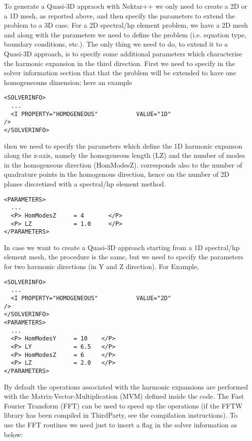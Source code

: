 To generate a Quasi-3D appraoch with Nektar++ we only need to create a 2D or a
1D mesh, as reported above, and then specify the parameters to extend the
problem to a 3D case. For a 2D spectral/hp element problem, we have a 2D mesh
and along with the parameters we need to define the problem (i.e. equation type,
boundary conditions, etc.). The only thing we need to do, to extend it to a
Quasi-3D approach, is to specify some additional parameters which characterise
the harmonic expansion in the third direction. First we need to specify in the
solver information section that that the problem will be extended to have one
homogeneouns dimension; here an example

\begin{lstlisting}[style=XMLStyle]
<SOLVERINFO>
  ...
  <I PROPERTY="HOMOGENEOUS"           VALUE="1D"                       />
</SOLVERINFO>
\end{lstlisting}

then we need to specify the parameters which define the 1D harmonic expanson
along the z-axis, namely the homogeneous length (LZ) and the number of modes in
the homogeneous direction (HomModesZ).  corresponds also to the number
of quadrature points in the homogenous direction, hence on the number of 2D
planes discretized with a spectral/hp element method.

\begin{lstlisting}[style=XMLStyle]
<PARAMETERS>
  ...
  <P> HomModesZ     = 4       </P>
  <P> LZ            = 1.0     </P>
</PARAMETERS>
\end{lstlisting}

In case we want to create a Quasi-3D approach starting from a 1D spectral/hp
element mesh, the procedure is the same, but we need to specify the parameters
for two harmonic directions (in Y and Z direction). For Example,

\begin{lstlisting}[style=XMLStyle]
<SOLVERINFO>
  ...
  <I PROPERTY="HOMOGENEOUS"           VALUE="2D"                         />
</SOLVERINFO>
<PARAMETERS>
  ...
  <P> HomModesY     = 10    </P>
  <P> LY            = 6.5   </P>
  <P> HomModesZ     = 6     </P>
  <P> LZ            = 2.0   </P>
</PARAMETERS>
\end{lstlisting}

By default the operations associated with the harmonic expansions are performed
with the Matrix-Vector-Multiplication (MVM) defined inside the code. The Fast
Fourier Transform (FFT) can be used to speed up the operations (if the FFTW
library has been compiled in ThirdParty, see the compilation instructions). To
use the FFT routines we need just to insert a flag in the solver information as
below:

